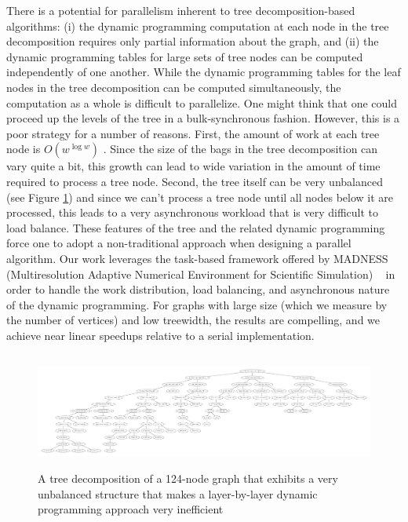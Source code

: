 \documentclass[conference]{IEEEtran}
\begin{document}
There is a potential for parallelism inherent to tree decomposition-based algorithms: (i) the dynamic programming computation at each node in the tree decomposition requires only partial information
about the graph, and (ii) the dynamic programming tables
for large sets of tree nodes can be computed independently of
one another.
While the dynamic programming tables for the leaf nodes in the tree decomposition
can be computed simultaneously, the computation as a whole is difficult to
parallelize. One might think that one could proceed up the levels of the tree in a
bulk-synchronous fashion. However, this is a poor strategy for a number of reasons.
First, the amount of work at each tree node is $O(w^{\log w})$ \cite{wilfcomplexity}.
Since the size of the bags in the tree decomposition can vary quite a bit,
this growth can lead to wide variation in the amount of time required to process a tree node.
Second, the tree itself can be very unbalanced (see Figure \ref{fig:unbalanced_tree}) and since we can't process a tree node
until all nodes below it are processed, this leads to a very asynchronous workload
that is very difficult to load balance.
These features of the tree and the related dynamic programming
force one to adopt a non-traditional approach when designing a parallel
algorithm.
Our work leverages the task-based framework offered
by MADNESS (Multiresolution Adaptive Numerical
Environment for Scientific Simulation) ~\cite{Thorntonintroducing} in order to handle the work distribution,
load balancing, and asynchronous nature of the dynamic
programming. For graphs with large size (which we measure by the number of vertices) and low treewidth, the results are compelling, and we achieve near linear speedups relative to a serial implementation. 

\begin{figure}[!th]
\begin{center}
\includegraphics[height=1.5in]{figures/pr124_TD.pdf}
\caption{A tree decomposition of a 124-node graph that exhibits a very unbalanced structure that makes
a layer-by-layer dynamic programming approach very inefficient}
\label{fig:unbalanced_tree}
\end{center}
\end{figure}
\end{document}
